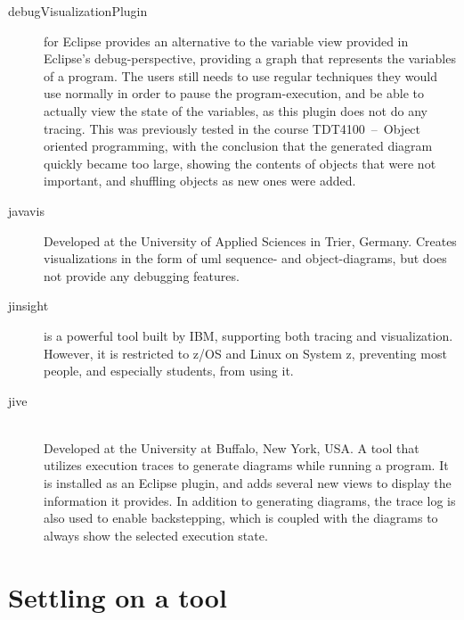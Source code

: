\begin{description}
\item[\gls{debugVisualizationPlugin}] for Eclipse provides an alternative to the variable view provided in Eclipse's debug-perspective, providing a graph that represents the variables of a program.
The users still needs to use regular techniques they would use normally in order to pause the program-execution, and be able to actually view the state of the variables, as this plugin does not do any tracing.
This was previously tested in the course TDT4100~--~Object oriented programming, with the conclusion that the generated diagram quickly became too large, showing the contents of objects that were not important, and shuffling objects as new ones were added.%

\item[\Gls{javavis}] \cite{Oechsle2002} Developed at the University of Applied Sciences in Trier, Germany.
Creates visualizations in the form of \gls{uml} sequence- and object-diagrams, but does not provide any debugging features.

\item[\Gls{jinsight}] \cite{Pauw} is a powerful tool built by IBM, supporting both tracing and visualization.
However, it is restricted to z/OS and Linux on System z, preventing most people, and especially students, from using it.

\item[\gls{jive}] \cite{Lessaa}\\
Developed at the University at Buffalo, New York, USA.
A tool that utilizes execution traces to generate diagrams while running a program.
It is installed as an Eclipse plugin, and adds several new views to display the information it provides.
In addition to generating diagrams, the trace log is also used to enable backstepping, which is coupled with the diagrams to always show the selected execution state.

\end{description}
\section{Settling on a tool}\label{preDiscuss}

